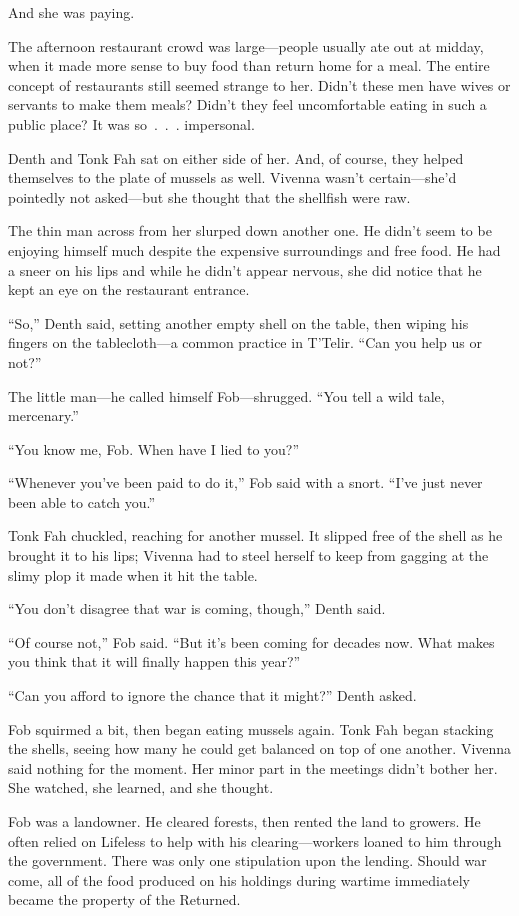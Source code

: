 And she was paying.

The afternoon restaurant crowd was large—people usually ate out at midday, when it made more sense to buy food than return home for a meal. The entire concept of restaurants still seemed strange to her. Didn’t these men have wives or servants to make them meals? Didn’t they feel uncomfortable eating in such a public place? It was so~.~.~. impersonal.

Denth and Tonk Fah sat on either side of her. And, of course, they helped themselves to the plate of mussels as well. Vivenna wasn’t certain—she’d pointedly not asked—but she thought that the shellfish were raw.

The thin man across from her slurped down another one. He didn’t seem to be enjoying himself much despite the expensive surroundings and free food. He had a sneer on his lips and while he didn’t appear nervous, she did notice that he kept an eye on the restaurant entrance.

“So,” Denth said, setting another empty shell on the table, then wiping his fingers on the tablecloth—a common practice in T’Telir. “Can you help us or not?”

The little man—he called himself Fob—shrugged. “You tell a wild tale, mercenary.”

“You know me, Fob. When have I lied to you?”

“Whenever you’ve been paid to do it,” Fob said with a snort. “I’ve just never been able to catch you.”

Tonk Fah chuckled, reaching for another mussel. It slipped free of the shell as he brought it to his lips; Vivenna had to steel herself to keep from gagging at the slimy plop it made when it hit the table.

“You don’t disagree that war is coming, though,” Denth said.

“Of course not,” Fob said. “But it’s been coming for decades now. What makes you think that it will finally happen this year?”

“Can you afford to ignore the chance that it might?” Denth asked.

Fob squirmed a bit, then began eating mussels again. Tonk Fah began stacking the shells, seeing how many he could get balanced on top of one another. Vivenna said nothing for the moment. Her minor part in the meetings didn’t bother her. She watched, she learned, and she thought.

Fob was a landowner. He cleared forests, then rented the land to growers. He often relied on Lifeless to help with his clearing—workers loaned to him through the government. There was only one stipulation upon the lending. Should war come, all of the food produced on his holdings during wartime immediately became the property of the Returned.

